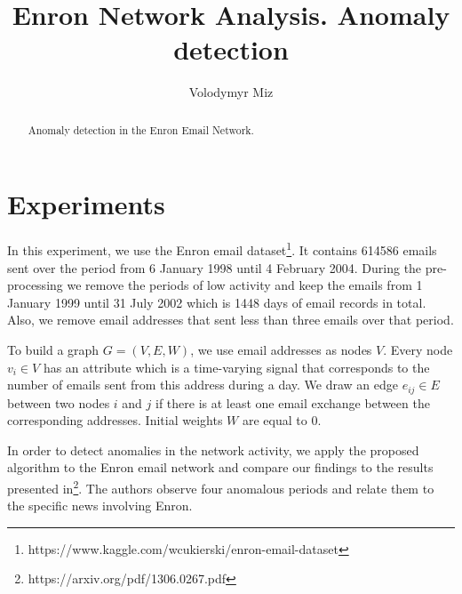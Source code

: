 \documentclass[]{article}
\title{Enron Network Analysis. Anomaly detection}
\author{Volodymyr Miz}
\begin{document}
\maketitle

\begin{abstract}
Anomaly detection in the Enron Email Network.
\end{abstract}

\section{Experiments}
In this experiment, we use the Enron email dataset\footnote{https://www.kaggle.com/wcukierski/enron-email-dataset}. It contains 614586 emails sent over the period from 6 January 1998 until 4 February 2004. During the pre-processing we remove the periods of low activity and keep the emails from 1 January 1999 until 31 July 2002 which is 1448 days of email records in total. Also, we remove email addresses that sent less than three emails over that period.

To build a graph \mbox{$G = (V,E,W)$}, we use email addresses as nodes $V$. Every node $v_i \in V$ has an attribute which is a time-varying signal that corresponds to the number of emails sent from this address during a day. We draw an edge $e_{ij} \in E$ between two nodes $i$ and $j$ if there is at least one email exchange between the corresponding addresses. Initial weights $W$ are equal to $0$.

In order to detect anomalies in the network activity, we apply the proposed algorithm to the Enron email network and compare our findings to the results presented in\footnote{https://arxiv.org/pdf/1306.0267.pdf}. The authors observe four anomalous periods and relate them to the specific news involving Enron.
\end{document}

